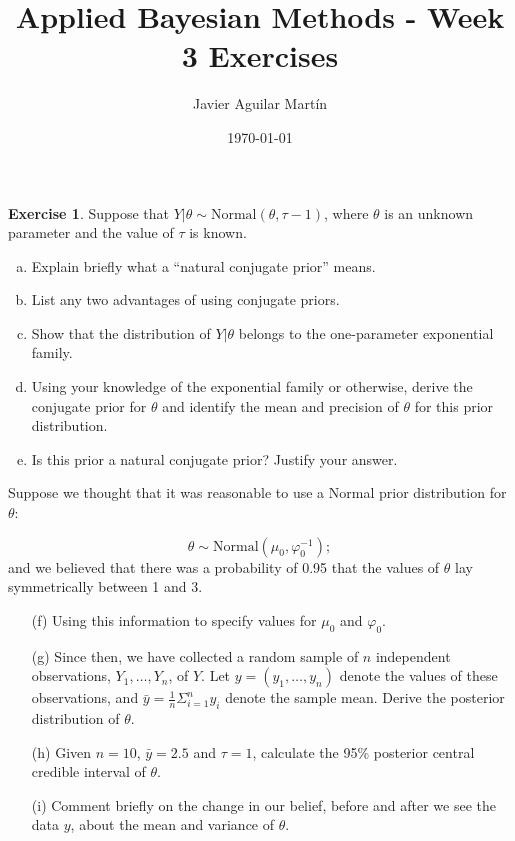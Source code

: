 \documentclass{article}
\theoremstyle{plain}
\theoremstyle{definition}
\newtheorem{exercise}{Exercise}
\begin{document}
\title{Applied Bayesian Methods - Week 3 Exercises}
\author{Javier Aguilar Martín}
\date{\today}
\maketitle
\begin{exercise}
Suppose that
$Y | θ \sim \mathrm{Normal}(θ, τ-1)$,
where $θ$ is an unknown parameter and the value of $τ$ is known.
\begin{enumerate}[(a)]
\item Explain briefly what a ``natural conjugate prior'' means.
\item List any two advantages of using conjugate priors.
\item Show that the distribution of $Y | θ$ belongs to the one-parameter
exponential family.
\item Using your knowledge of the exponential family or otherwise, derive
the conjugate prior for $θ$ and identify the mean and precision
of $θ$ for this prior distribution.
\item Is this prior a natural conjugate prior? Justify your answer.

\end{enumerate}
Suppose we thought that it was reasonable to use a Normal prior distribution
for $θ$:

\[θ \sim \mathrm{Normal}(μ_0, φ^{-1}_0 ) ;\]
and we believed that there was a probability of 0.95 that the values of
$θ$ lay symmetrically between 1 and 3.
\begin{enumerate}
\item[(f)] Using this information to specify values for $μ_0$ and $φ_0$.
\item[(g)] Since then, we have collected a random sample of $n$ independent
observations, $Y_1,\dots, Y_n$, of $Y$. Let $y = (y_1, \dots , y_n)$ denote the values of these observations, and $\bar{y} = \frac{1}{n}Σ^n_{i=1} y_i$ denote the sample mean. Derive the posterior distribution of $θ$.
\item[(h)] Given $n = 10$, $\bar{y} = 2.5$ and $τ = 1$, calculate the 95\% posterior central credible interval of $θ$.
\item[(i)] Comment briefly on the change in our belief, before and after we
see the data $y$, about the mean and variance of $θ$.
\end{enumerate}
 

\end{exercise}
\end{document}
